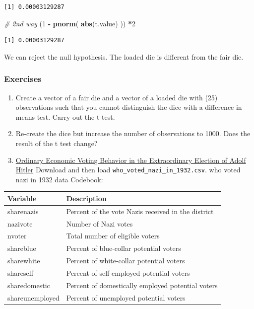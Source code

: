 \documentclass[]{article}
\newenvironment{Shaded}{\begin{snugshade}}{\end{snugshade}}
\newcommand{\KeywordTok}[1]{\textcolor[rgb]{0.13,0.29,0.53}{\textbf{#1}}}
\newcommand{\DecValTok}[1]{\textcolor[rgb]{0.00,0.00,0.81}{#1}}
\newcommand{\StringTok}[1]{\textcolor[rgb]{0.31,0.60,0.02}{#1}}
\newcommand{\CommentTok}[1]{\textcolor[rgb]{0.56,0.35,0.01}{\textit{#1}}}
\newcommand{\OperatorTok}[1]{\textcolor[rgb]{0.81,0.36,0.00}{\textbf{#1}}}
\newcommand{\NormalTok}[1]{#1}
\providecommand{\tightlist}{%
  \setlength{\itemsep}{0pt}\setlength{\parskip}{0pt}}
\theoremstyle{definition}
\theoremstyle{definition}
\theoremstyle{definition}
\theoremstyle{remark}
\begin{document}
\begin{verbatim}
[1] 0.00003129287
\end{verbatim}

\begin{Shaded}
\begin{Highlighting}[]
\CommentTok{# 2nd way}
\NormalTok{(}\DecValTok{1} \OperatorTok{-}\StringTok{ }\KeywordTok{pnorm}\NormalTok{( }\KeywordTok{abs}\NormalTok{(t.value) )) }\OperatorTok{*}\DecValTok{2} 
\end{Highlighting}
\end{Shaded}

\begin{verbatim}
[1] 0.00003129287
\end{verbatim}

We can reject the null hypothesis. The loaded die is different from the
fair die.

\subsubsection{Exercises}\label{exercises-4}

\begin{enumerate}
\def\labelenumi{\arabic{enumi}.}
\tightlist
\item
  Create a vector of a fair die and a vector of a loaded die with (25)
  observations such that you cannot distinguish the dice with a
  difference in means test. Carry out the t-test.
\item
  Re-create the dice but increase the number of observations to 1000.
  Does the result of the t test change?
\item
  \href{https://www.cambridge.org/core/journals/journal-of-economic-history/article/ordinary-economic-voting-behavior-in-the-extraordinary-election-of-adolf-hitler/8C79A0AB9DA174B7D81A6EB313B1EDFC}{Ordinary
  Economic Voting Behavior in the Extraordinary Election of Adolf
  Hitler} Download and then load
  \texttt{who\_voted\_nazi\_in\_1932.csv}. who voted nazi in 1932 data
  Codebook: 
\end{enumerate}

\begin{longtable}[]{@{}ll@{}}
\toprule
Variable & Description\tabularnewline
\midrule
\endhead
sharenazis & Percent of the vote Nazis received in the
district\tabularnewline
nazivote & Number of Nazi votes\tabularnewline
nvoter & Total number of eligible voters\tabularnewline
shareblue & Percent of blue-collar potential voters\tabularnewline
sharewhite & Percent of white-collar potential voters\tabularnewline
shareself & Percent of self-employed potential voters\tabularnewline
sharedomestic & Percent of domestically employed potential
voters\tabularnewline
shareunemployed & Percent of unemployed potential voters\tabularnewline
\bottomrule
\end{longtable}
\end{document}
